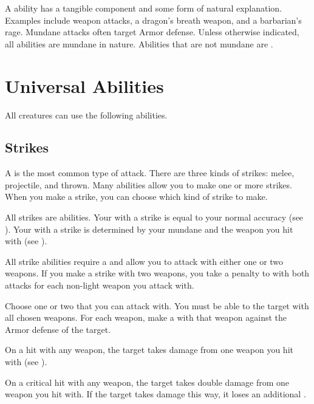         \label{Mundane Abilities} A  ability has a tangible component and some form of natural explanation.
        Examples include weapon attacks, a dragon's breath weapon, and a barbarian's rage.
        Mundane attacks often target Armor defense.
        Unless otherwise indicated, all abilities are mundane in nature.
        Abilities that are not mundane are .

\section{Universal Abilities}\label{Universal Abilities}
    All creatures can use the following abilities.

    \subsection{Strikes}\label{Strikes}
        A  is the most common type of attack.
        There are three kinds of strikes: melee, projectile, and thrown.
        Many abilities allow you to make one or more strikes.
        When you make a strike, you can choose which kind of strike to make.

        All strikes are  abilities.
        Your  with a strike is equal to your normal accuracy (see ).
        Your  with a strike is determined by your mundane  and the weapon you hit with (see ).

        \label{Two-Weapon Strikes}
        All strike abilities require a  and allow you to attack with either one or two weapons.
        If you make a strike with two weapons, you take a  penalty to  with both attacks for each non-light weapon you attack with.

        \begin{freeability}{}
            Choose one or two  that you can attack with.
            You must be able to  the target with all chosen weapons.
            For each weapon, make a  with that weapon against the Armor defense of the target.

            On a hit with any weapon, the target takes damage from one weapon you hit with (see ).

            On a critical hit with any weapon, the target takes double damage from one weapon you hit with.
            If the target takes damage this way, it loses an additional .
        \end{freeability}

